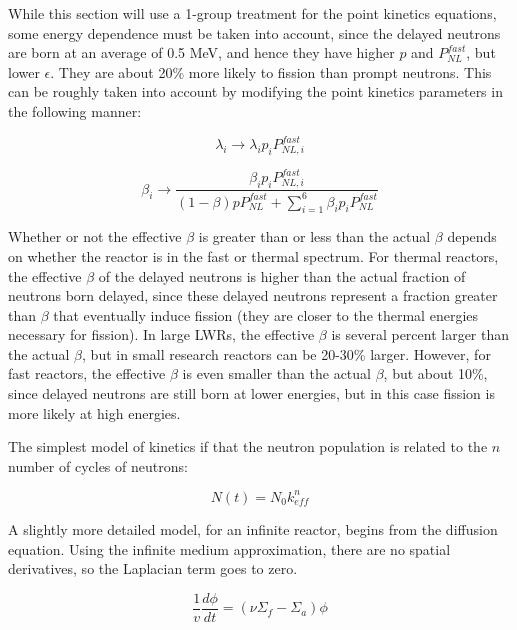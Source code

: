 \documentclass[10pt]{article}
\begin{document}
\begin{flushleft}
While this section will use a 1-group treatment for the point kinetics equations, some energy dependence must be taken into account, since the delayed neutrons are born at an average of 0.5 MeV, and hence they have higher \(p\) and \(P_{NL}^{fast}\), but lower \(\epsilon\). They are about 20\% more likely to fission than prompt neutrons. This can be roughly taken into account by modifying the point kinetics parameters in the following manner:

\begin{equation}
\label{eq:ModifiedKineticsParameters_Lambda1}
\lambda_i \rightarrow \lambda_i p_i P_{NL,i}^{fast}
\end{equation}

\begin{equation}
\label{eq:ModifiedKineticsParameters_Beta2}
\beta_i \rightarrow \frac{\beta_i p_i P_{NL,i}^{fast}}{(1-\beta)pP_{NL}^{fast}+\sum_{i=1}^{6}\beta_i p_i P_{NL}^{fast}}
\end{equation}

Whether or not the effective \(\beta\) is greater than or less than the actual \(\beta\) depends on whether the reactor is in the fast or thermal spectrum. For thermal reactors, the effective \(\beta\) of the delayed neutrons is higher than the actual fraction of neutrons born delayed, since these delayed neutrons represent a fraction greater than \(\beta\) that eventually induce fission (they are closer to the thermal energies necessary for fission). In large LWRs, the effective \(\beta\) is several percent larger than the actual \(\beta\), but in small research reactors can be 20-30\% larger. However, for fast reactors, the effective \(\beta\) is even smaller than the actual \(\beta\), but about 10\%, since delayed neutrons are still born at lower energies, but in this case fission is more likely at high energies.

The simplest model of kinetics if that the neutron population is related to the \(n\) number of cycles of neutrons:

\begin{equation}
\label{eq:SimplestKineticsModel}
N(t)=N_0k_{eff}^{n}
\end{equation}

A slightly more detailed model, for an infinite reactor, begins from the diffusion equation. Using the infinite medium approximation, there are no spatial derivatives, so the Laplacian term goes to zero. 

\begin{equation}
\label{eq:InfiniteReactorKinetics1}
\frac{1}{v}\frac{d\phi}{dt}=(\nu\Sigma_f-\Sigma_a)\phi
\end{equation}


\end{flushleft}
\end{document}

